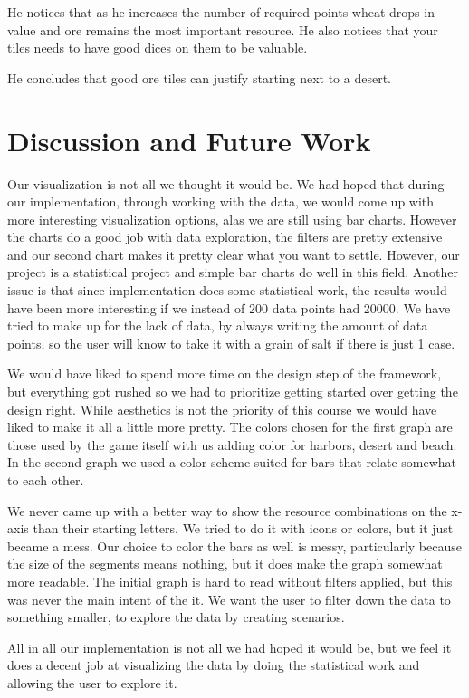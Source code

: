 \documentclass[journal]{vgtc}                %
\begin{document}
\noindent
He notices that as he increases the number
of required points wheat drops in value and ore remains the most important
resource. He also notices that your tiles needs to have good dices on them to
be valuable.

He concludes that good ore tiles can justify starting next to a desert.

\section{Discussion and Future Work}

Our visualization is not all we thought it would be. We had hoped that during
our implementation, through working with the data, we would come up with
more interesting visualization options, alas we are still using bar charts.
However the charts do a good job with data exploration, the filters are pretty
extensive and our second chart makes it pretty clear what you want to settle.
However, our project is a statistical project and simple bar charts do well
in this field. Another issue is that since implementation does some statistical
work, the results would have been more interesting if we instead of 200
data points had 20000. We have tried to make up for the lack of data, by
always writing the amount of data points, so the user will know to take it
with a grain of salt if there is just 1 case.

We would have liked to spend more time on the design step of the framework,
but everything got rushed so we had to prioritize getting started over getting
the design right. While aesthetics is not the priority of this course we would
have liked to make it all a little more pretty. The colors chosen for the
first graph are those used by the game itself with us adding color for
harbors, desert and beach. In the second graph we used a color scheme suited
for bars that relate somewhat to each other. 

We never came up with a better way to show the resource combinations on the
x-axis than their starting letters. We tried to do it with icons or colors,
but it just became a mess. Our choice to color the bars as well is messy,
particularly because the size of the segments means nothing, but it does make
the graph somewhat more readable. The initial graph is hard to read without
filters applied, but this was never the main intent of the it. We want the
user to filter down the data to something smaller, to explore the data by
creating scenarios.

All in all our implementation is not all we had hoped it would be, but we feel
it does a decent job at visualizing the data by doing the statistical work and
allowing the user to explore it.
\end{document}
